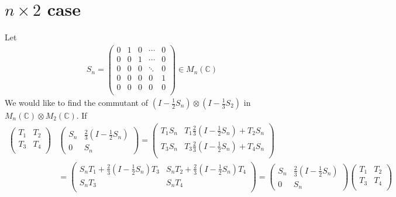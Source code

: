 \documentclass[a4paper,10pt]{amsart}
\newcommand{\C}{\mathbb C} %
\begin{document}
\section{$n \times 2$ case}
Let
\begin{align*}
    S_{n} = \begin{pmatrix} 
    0 & 1 & 0 & \cdots & 0 \\
    0 & 0 & 1 & \cdots & 0\\
    0 & 0 & 0 & \ddots & 0 \\
    0 & 0 & 0 & 0 & 1 \\
    0 & 0 & 0 & 0 & 0  \\
    \end{pmatrix} \in M_{n}(\C) 
\end{align*}
We would like to find the commutant of $(I-\frac{1}{2}S_n) \otimes (I- \frac{1}{3}S_2)$
in $M_n(\C) \otimes M_2(\C)$. If
\begin{align*}
\begin{pmatrix}
    T_1 & T_2 \\
    T_3 & T_4 \\
\end{pmatrix}
&
   \begin{pmatrix}
       S_n & \frac{2}{3} (I-\frac{1}{2}S_n) \\
       0 & S_n
   \end{pmatrix}  =
   \begin{pmatrix}
       T_1 S_n & T_1 \frac{2}{3} (I-\frac{1}{2}S_n) + T_2 S_n \\
       T_3 S_n & T_3 \frac{2}{3} (I-\frac{1}{2}S_n) + T_4 S_n \\
   \end{pmatrix} \\
   & = 
\begin{pmatrix}
    S_n T_1 +  \frac{2}{3} (I-\frac{1}{2}S_n)T_3 & S_n T_2 + \frac{2}{3} (I-\frac{1}{2}S_n)T_4 \\
    S_n T_3 & S_n T_4\\
\end{pmatrix}
= \begin{pmatrix}
       S_n & \frac{2}{3} (I-\frac{1}{2}S_n) \\
       0 & S_n
   \end{pmatrix} 
\begin{pmatrix}
    T_1 & T_2 \\
    T_3 & T_4 \\
\end{pmatrix}
\end{align*}
\end{document}
